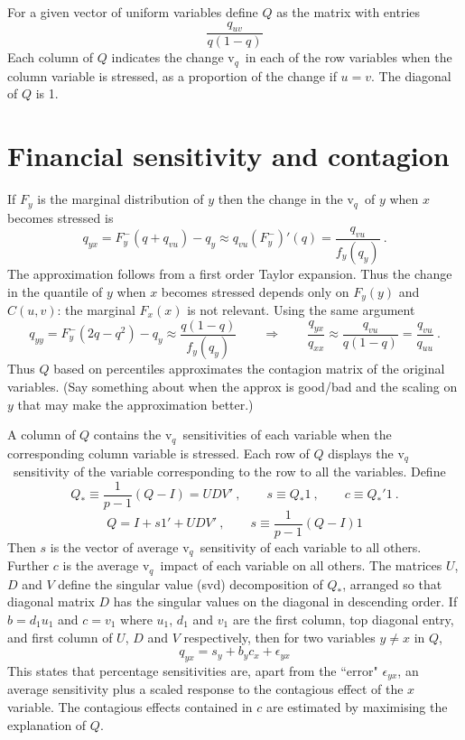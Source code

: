 \documentclass[authoryear]{elsarticle}
\newcommand{\eps}{\epsilon}
\renewcommand{\v}{\ensuremath{\mathrm{v}_q}}
\newcommand{\cq}{\ , \qquad}
\begin{document}
For a given vector of uniform variables define $Q$ as the matrix with entries 
$$
\frac{q_{uv}}{q(1-q)}
$$   
Each column of $Q$ indicates the change \v\ in each of the row variables when the column variable  is stressed, as a proportion of the change if $u=v$.  The diagonal of $Q$ is 1. 

\section{Financial sensitivity and contagion}
 
 If $F_y$ is the marginal distribution of $y$ then the change in the \v\ of $y$ when $x$ becomes stressed is
 $$
 q_{yx}= F_y^-(q+q_{vu}) - q_y \approx q_{vu}(F_y^-)'(q) = \frac{q_{vu}}{f_y(q_y)} \ .
 $$
The approximation follows from a first order Taylor expansion.    Thus the change in the quantile of $y$ when $x$ becomes stressed depends only on  $F_y(y)$ and $C(u,v)$:  the marginal $F_x(x)$ is not relevant.  Using the same argument
 $$
 q_{yy}=  F_y^-(2q-q^2) - q_y\approx \frac{q(1-q)}{f_y(q_y)}
 \qquad\Rightarrow\qquad
 \frac{q_{yx}}{q_{xx}} \approx  \frac{q_{vu}}{q(1-q)}=\frac{q_{vu}}{q_{uu}}\ .
 $$
 Thus $Q$ based on percentiles approximates the contagion matrix of the original variables.
(Say something about when the approx is good/bad and the scaling on $y$ that may make the approximation better.)

A column of $Q$ contains the \v\ sensitivities of each variable when the  corresponding column variable is stressed.   Each row of $Q$ displays the \v\ sensitivity of the variable corresponding to the row to all the variables.  Define
$$
Q_* \equiv \frac{1}{p-1}(Q-I)=UDV'\cq s\equiv Q_*1\cq c\equiv Q_*'1\ .
$$$$
Q=I + s1'+ UDV'\cq s\equiv \frac{1}{p-1}(Q-I)1
$$
Then $s$ is the vector of average \v\ sensitivity of each variable to all others.  Further $c$ is the average \v\ impact of each variable on all others.   The matrices $U$, $D$ and $V$ define the singular value (svd) decomposition of $Q_*$, arranged so that diagonal matrix $D$ has the singular values on  the diagonal in descending order.   If $b=d_1u_1$ and $c=v_1$ where $u_1$, $d_1$ and $v_1$ are the first column, top diagonal entry, and first column of $U$, $D$ and $V$ respectively, then  for two variables $y\ne x$ in $Q$,
$$
q_{yx} = s_y+ b_yc_x +\eps_{yx}
$$
This states that percentage sensitivities are, apart from the ``error" $\eps_{yx}$, an average sensitivity plus a scaled response to the contagious effect of the $x$ variable.   The contagious effects contained in $c$ are estimated by maximising the explanation of $Q$.
\end{document}
